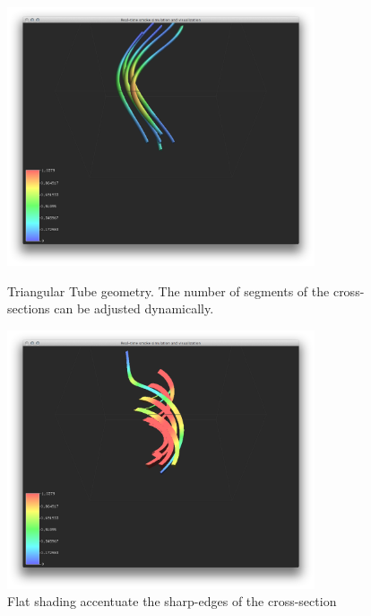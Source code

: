 \begin{figure}[htbp]
\centering
\begin{minipage}[t]{0.48\textwidth}
        \includegraphics[height=3in]{figures/streamtubes/40threeSegments.png}
\caption{Triangular Tube geometry. The number of segments of the cross-sections can be adjusted dynamically.}
\label{fig:}
\end{minipage}\hspace{.04\textwidth}%
\begin{minipage}[t]{0.48\textwidth}
        \includegraphics[height=3in]{figures/streamtubes/41flatshading.png}
    \caption{Flat shading accentuate the sharp-edges of the cross-section}
    \label{fig:}
\end{minipage}
\end{figure}


